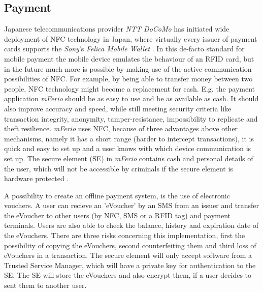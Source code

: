 

\subsection{Payment}
Japanese telecommunications provider \textit{NTT DoCoMo} has initiated wide deployment of NFC technology in Japan, where virtually every issuer of payment cards supports the \textit{Sony}'s \textit{Felica Mobile Wallet} \cite{yamauchi2006intensive}.
In this de-facto standard for mobile payment the mobile device emulates the behaviour of an RFID card, but in the future much more is possible by making use of the active communication possibilities of NFC. For example, by being able to transfer money between two people, NFC technology might become a replacement for cash. E.g. the payment application \textit{mFerio} should be as easy to use and be as available as cash. It should also improve accuracy and speed, while still meeting security criteria like transaction integrity, anonymity, tamper-resistance, impossibility to replicate and theft resilience. 
\textit{mFerio} uses NFC, because of three advantages above other mechanisms, namely it has a short range (harder to intercept transactions), it is quick and easy to set up and a user knows with which device communication is set up. The secure element (SE) in \textit{mFerio} contains cash and personal details of the user, which will not be accessible by criminals if the secure element is hardware protected \cite{1555846}.

A possibility to create an offline payment system, is the use of electronic vouchers. A user can recieve an 'eVoucher' by an SMS from an issuer and transfer the eVoucher to other users (by NFC, SMS or a RFID tag) and payment terminals. Users are also able to check the balance, history and expiration date of the eVouchers. 
There are three risks concerning this implementation, first the possibility of copying the eVouchers, second counterfeiting them and third loss of eVouchers in a transaction. The secure element will only accept software from a Trusted Service Manager, which will have a private key for authentication to the SE. The SE will store the eVouchers and also encrypt them, if a user decides to sent them to another user. \cite{1592613}


